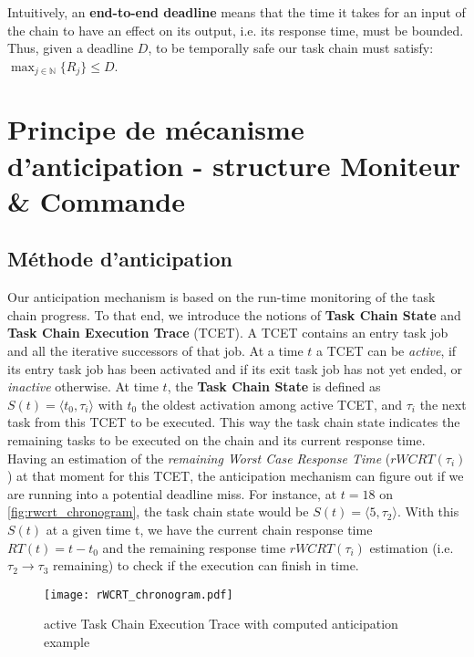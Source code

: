 \documentclass[french, a4paper, 11pt, twoside, pdftex]{StyleThese}
\begin{document}
    Intuitively, an \textbf{end-to-end deadline} means that the time it takes for an input of the chain to have an effect on its output, i.e. its response time, must be bounded. Thus, given a deadline $D$, to be temporally safe our task chain must satisfy: $\max_{j \in \mathbb{N}}\{R_j\} \leq D$. 
    
\section{Principe de mécanisme d'anticipation - structure Moniteur \& Commande}
    \subsection{Méthode d'anticipation}
    
    Our anticipation mechanism is based on the run-time monitoring of the task chain progress. To that end, we introduce the notions of \textbf{Task Chain State} and \textbf{Task Chain Execution Trace} (TCET). A TCET contains an entry task job and all the iterative successors of that job. At a time $t$ a TCET can be \emph{active}, if its entry task job has been activated and if its exit task job has not yet ended, or \emph{inactive} otherwise. 
    At time $t$, the \textbf{Task Chain State} is defined as $S(t)=\langle t_0, \tau_i\rangle$ with $t_0$ the oldest activation among active TCET, and $\tau_i$ the next task from this TCET to be executed. This way the task chain state indicates the remaining tasks to be executed on the chain and its current response time. Having an estimation of the \emph{remaining Worst Case Response Time} ($rWCRT(\tau_i)$) at that moment for this TCET, the anticipation mechanism can figure out if we are running into a potential deadline miss. For instance, at $t=18$ on \autoref{fig:rwcrt_chronogram}, the task chain state would be $S(t)=\langle 5, \tau_{2} \rangle $. With this $S(t)$ at a given time t, we have the current chain response time $RT(t) = t - t_0$ and the remaining response time $rWCRT(\tau_i)$ estimation (i.e. $\tau_2 \rightarrow \tau_3$ remaining) to check if the execution can finish in time.

    \begin{figure}
        \centering 
        \texttt{[image: rWCRT\_chronogram.pdf]}
        \caption{active Task Chain Execution Trace with computed anticipation example}
        \label{fig:rwcrt_chronogram}
    \end{figure}
    
\end{document}
